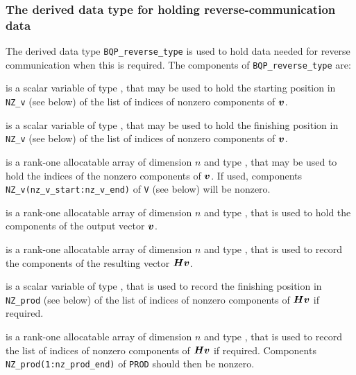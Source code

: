 \documentclass{galahad}
\newcommand{\packagename}{BQP}
\begin{document}




\subsubsection{The derived data type for holding reverse-communication data}\label{typereverse}
The derived data type 
{\tt \packagename\_reverse\_type} 
is used to hold data needed for reverse communication when this is
required.
The components of 
{\tt \packagename\_reverse\_type} 
are:

\begin{description}

 is a scalar variable of type \integer, that 
may be used to hold the starting position in {\tt NZ\_v} (see below) 
of the list of indices of nonzero components of ${\bm{v}}$.

 is a scalar variable of type \integer, that 
may be used to hold the finishing position in {\tt NZ\_v} (see below) 
of the list of indices of nonzero components of ${\bm{v}}$.

 is a rank-one allocatable array of dimension $n$
and type \integer, that may be used to hold the indices of the
nonzero components of ${\bm{v}}$. If used, components 
{\tt NZ\_v(nz\_v\_start:nz\_v\_end)} of {\tt V} (see below) will be nonzero.

 is a rank-one allocatable array of dimension $n$
and type \realdp, that is used to hold the components of the
output vector ${\bm{v}}$.

 is a rank-one allocatable array of dimension $n$
and type \realdp, that is used to record the components of the
resulting vector ${\bm{H}} {\bm{v}}$.

 is a scalar variable of type \integer, that 
is used to record the finishing position in {\tt NZ\_prod} (see below) 
of the list of indices of nonzero components of ${\bm{H}} {\bm{v}}$ if required.

 is a rank-one allocatable array of dimension $n$
and type \integer, that is used to record the list of
indices of nonzero components of ${\bm{H}} {\bm{v}}$ if required. Components
{\tt NZ\_prod(1:nz\_prod\_end)} of {\tt PROD} should then be nonzero.

\end{description}

\end{document}
